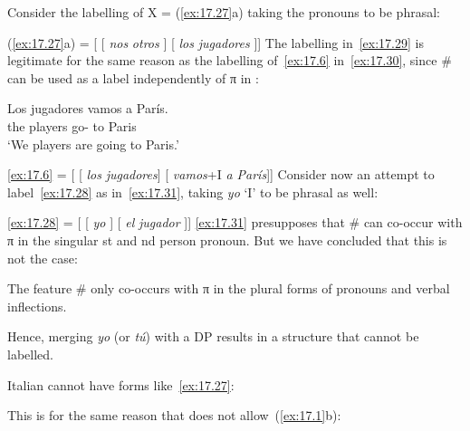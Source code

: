 \documentclass[output=paper]{langsci/langscibook}
\begin{document}
\label{ex:17.28}
\z
Consider the labelling of X = (\ref{ex:17.27}a) taking the pronouns to be
phrasal:

\ea\label{ex:17.29}
    (\ref{ex:17.27}a) = [ [ \emph{nos}\tss{\#} \emph{otros} ] [ \emph{los}\tss{\#} \emph{jugadores} ]]
\z
The labelling in~\eqref{ex:17.29} is legitimate for the same reason as the
labelling of~\eqref{ex:17.6} in~\eqref{ex:17.30}, since \# can be used as a
label independently of π in :

\begin{exe}
\exi{\eqref{ex:17.6}}
    \gll    Los jugadores vamos a París.\\
            the players      go-\Fpl{} to Paris\\
    \glt    ‘We players are going to Paris.’
\end{exe}

\ea\label{ex:17.30}
    \eqref{ex:17.6} = [ [ \emph{los}\tss{\#} \emph{jugadores}] [ \emph{vamos}+I\tss{\#}  \emph{a París}]]
\z
Consider now an attempt to label~\eqref{ex:17.28} as
in~\eqref{ex:17.31}, taking \emph{yo} ‘I’ to be phrasal as well:

\ea\label{ex:17.31}
    \eqref{ex:17.28} = [ [ \emph{yo} ] [ \emph{el}\tss{\#} \emph{jugador} ]]
\z
\eqref{ex:17.31} presupposes that \# can co-occur with π in the singular
\First{}st and \Second{}nd person pronoun. But we have concluded that this is
not the case:

\begin{exe}
\exi{\eqref{ex:17.21}}
    The feature \# only co-occurs with π in the plural forms of pronouns
    and verbal inflections.
\end{exe}
Hence, merging \emph{yo} (or \emph{tú}) with a DP results in a structure that
cannot be labelled.

Italian cannot have forms like~\eqref{ex:17.27}:

\ea\label{ex:17.32}
    \z
\z
This is for the same reason that  does not allow~(\ref{ex:17.1}b):
\end{document}
